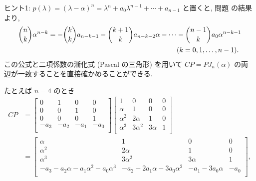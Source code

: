 \documentclass[12pt,twoside]{jarticle}
\begin{document}
\noindent
ヒント1: $p(\lambda)=(\lambda-\alpha)^n
=\lambda^n+a_0\lambda^{n-1}+\cdots+a_{n-1}$ と置くと,
問題  の結果より, 
\begin{align*}
  &
  \binom{n}{k}\alpha^{n-k}
  =
  - \binom{k}{k}a_{n-k-1}
  - \binom{k+1}{k}a_{n-k-2}\alpha
  - \cdots
  - \binom{n-1}{k}a_0\alpha^{n-k-1}
  \\ &
  \hphantom{
  \binom{n}{k}\alpha^{n-k}
  =
  - \binom{k}{k}a_{n-k-1}
  - \binom{k+1}{k}a_{n-k-2}\alpha
  - \cdots
  }
  (k=0,1,\dots,n-1).
\end{align*}
この公式と二項係数の漸化式 (Pascal の三角形) を用いて $CP=PJ_n(\alpha)$ の両
辺が一致することを直接確かめることができる.

たとえば $n=4$ のとき
\begin{align*}
  CP 
  &
  =
  \begin{bmatrix}
    0 & 1 & 0 & 0 \\
    0 & 0 & 1 & 0 \\
    0 & 0 & 0 & 1 \\
    -a_3 & -a_2 & -a_1 & -a_0 \\
  \end{bmatrix}
  \begin{bmatrix}
    1        & 0         & 0       & 0 \\
    \alpha   & 1         & 0       & 0 \\
    \alpha^2 & 2\alpha   & 1       & 0 \\
    \alpha^3 & 3\alpha^2 & 3\alpha & 1 \\
  \end{bmatrix}
  \\ &
  =
  \begin{bmatrix}
    \alpha   & 1         & 0       & 0 \\
    \alpha^2 & 2\alpha   & 1       & 0 \\
    \alpha^3 & 3\alpha^2 & 3\alpha & 1 \\
    -a_3-a_2\alpha-a_1\alpha^2-a_0\alpha^3 & -a_2-2a_1\alpha-3a_0\alpha^2 &
    -a_1-3a_0\alpha & -a_0 \\
  \end{bmatrix},
\end{align*}
\end{document}
